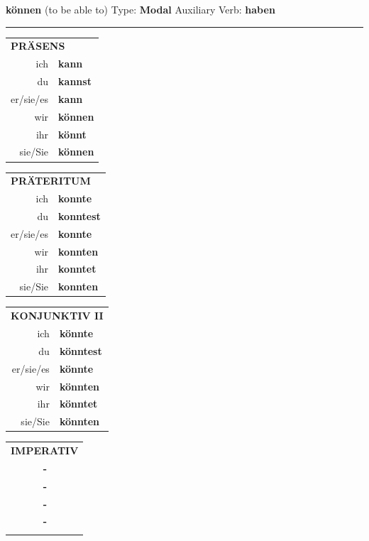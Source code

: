 \documentclass[10pt,a4paper]{revtex4-2}
\begin{document}
\begin{verbbox-modal}
    {\Large \bf können} (to be able to) \hfill Type: \textbf{Modal} \hfill Auxiliary Verb: \textbf{haben} 
     \vspace{5pt}
    \hrule
    \vspace{5pt}
  \begin{tabular}{rl}
     \multicolumn{2}{l}{\textbf{PRÄSENS} }\\
    ich & \textbf{kann}\\
    du & \textbf{kannst}\\
    er/sie/es & \textbf{kann}\\
    wir & \textbf{können}\\
    ihr & \textbf{könnt}\\
    sie/Sie & \textbf{können}\\
  \end{tabular}
  \hfill
     \begin{tabular}{rl}
    \multicolumn{2}{l}{\textbf{PRÄTERITUM} }\\
    ich & \textbf{konnte}\\
    du & \textbf{konntest}\\
    er/sie/es & \textbf{konnte}\\
    wir & \textbf{konnten}\\
    ihr & \textbf{konntet}\\
    sie/Sie & \textbf{konnten}\\
  \end{tabular}
   \hfill
     \begin{tabular}{rl}
    \multicolumn{2}{l}{\textbf{KONJUNKTIV II} }\\
    ich & \textbf{könnte}\\
    du & \textbf{könntest}\\
    er/sie/es & \textbf{könnte}\\
    wir & \textbf{könnten}\\
    ihr & \textbf{könntet}\\
    sie/Sie & \textbf{könnten}\\
  \end{tabular}
  \hfill
  \begin{tabular}{rl}
     \multicolumn{2}{l}{\textbf{IMPERATIV} }\\
   & \textbf{-}\\
   & \textbf{-}\\
   & \textbf{-}\\
   & \textbf{-}\\
   & \vspace{10pt}
  \end{tabular}


\end{verbbox-modal}
\end{document}
